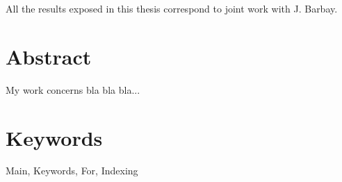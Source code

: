 %

All the results exposed in this thesis correspond to joint work with J. Barbay.

\vfill

\clearpage


\begin{center}

\vfill
\section*{Abstract}
My work concerns bla bla bla...

\vfill
\section*{Keywords}
Main, Keywords, For, Indexing

\vfill
\end{center}




\clearpage{\pagestyle{empty}\cleardoublepage}
\tableofcontents

\cleardoublepage
{}












